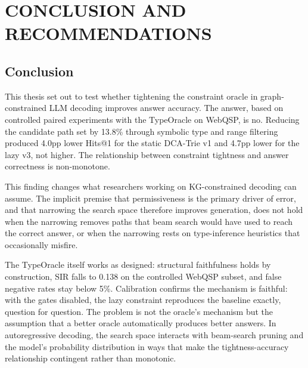 
\chapter{CONCLUSION AND RECOMMENDATIONS}
\label{Chapter5}

\section{Conclusion}
\label{sec:ch5conclusion}

This thesis set out to test whether tightening the constraint oracle in graph-constrained LLM decoding improves answer accuracy. The answer, based on controlled paired experiments with the TypeOracle on WebQSP, is no. Reducing the candidate path set by 13.8\% through symbolic type and range filtering produced 4.0pp lower Hits@1 for the static DCA-Trie v1 and 4.7pp lower for the lazy v3, not higher. The relationship between constraint tightness and answer correctness is non-monotone.

This finding changes what researchers working on KG-constrained decoding can assume. The implicit premise that permissiveness is the primary driver of error, and that narrowing the search space therefore improves generation, does not hold when the narrowing removes paths that beam search would have used to reach the correct answer, or when the narrowing rests on type-inference heuristics that occasionally misfire.

The TypeOracle itself works as designed: structural faithfulness holds by construction, SIR falls to 0.138 on the controlled WebQSP subset, and false negative rates stay below 5\%. Calibration confirms the mechanism is faithful: with the gates disabled, the lazy constraint reproduces the baseline exactly, question for question. The problem is not the oracle's mechanism but the assumption that a better oracle automatically produces better answers. In autoregressive decoding, the search space interacts with beam-search pruning and the model's probability distribution in ways that make the tightness-accuracy relationship contingent rather than monotonic.

